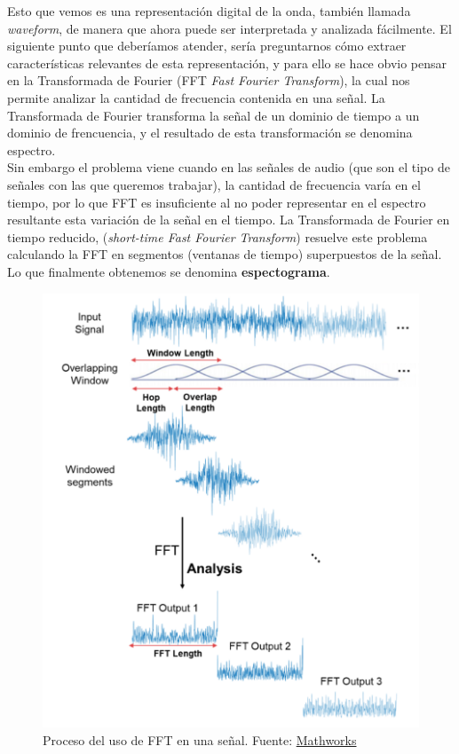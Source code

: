 \documentclass[11pt,a4paper,spanish]{book}
\begin{document}
	Esto que vemos es una representación digital de la onda, también llamada \emph{waveform}, de manera que ahora puede ser interpretada y analizada fácilmente.\hfill \break
	El siguiente punto que deberíamos atender, sería preguntarnos cómo extraer características relevantes de esta representación, y para ello se hace obvio pensar en la Transformada de Fourier (FFT \emph{Fast Fourier Transform}), la cual nos permite analizar la cantidad de frecuencia contenida en una señal. La Transformada de Fourier transforma la señal de un dominio de tiempo a un dominio de frencuencia, y el resultado de esta transformación se denomina espectro. \\
	Sin embargo el problema viene cuando en las señales de audio (que son el tipo de señales con las que queremos trabajar), la cantidad de frecuencia varía en el tiempo, por lo que FFT es insuficiente al no poder representar en el espectro resultante esta variación de la señal en el tiempo. La Transformada de Fourier en tiempo reducido, (\emph{short-time Fast Fourier Transform}) resuelve este problema calculando la FFT en segmentos (ventanas de tiempo) superpuestos de la señal. Lo que finalmente obtenemos se denomina \textbf{espectograma}.
	
	\begin{figure}[H]
		\centering
		\includegraphics[scale=0.25]{processFFT.png} 
		\caption{Proceso del uso de FFT en una señal. Fuente: \href{https://www.mathworks.com/help/dsp/ref/dsp.stft.html}{Mathworks}}
	\end{figure} 
	
\end{document}
